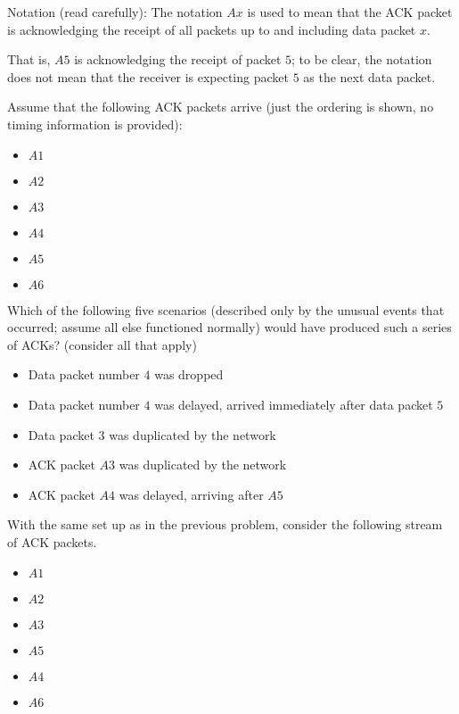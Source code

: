 \documentclass{supervision}
\begin{document}
\begin{questions}
\begin{parts}
\begin{subparts}
                Notation (read carefully): The notation $Ax$ is used to mean
                that the ACK packet is acknowledging the receipt of all packets
                up to and including data packet $x$.

                That is, $A5$ is acknowledging the receipt of packet $5$; to be
                clear, the notation does not mean that the receiver is
                expecting packet $5$ as the next data packet.

                Assume that the following ACK packets arrive (just the ordering
                is shown, no timing information is provided):

                \begin{itemize}
                  \item $A1$
                  \item $A2$
                  \item $A3$
                  \item $A4$
                  \item $A5$
                  \item $A6$
                \end{itemize}

                Which of the following five scenarios (described only by the
                unusual events that occurred; assume all else functioned
                normally) would have produced such a series of ACKs? (consider
                all that apply)

                \begin{itemize}
                  \item Data packet number $4$ was dropped
                  \item Data packet number $4$ was delayed, arrived immediately
                    after data packet $5$
                  \item Data packet $3$ was duplicated by the network
                  \item ACK packet $A3$ was duplicated by the network
                  \item ACK packet $A4$ was delayed, arriving after $A5$
                \end{itemize}

              \subpart With the same set up as in the previous problem,
                consider the following stream of ACK packets.

                \begin{itemize}
                  \item $A1$
                  \item $A2$
                  \item $A3$
                  \item $A5$
                  \item $A4$
                  \item $A6$
                \end{itemize}


\end{subparts}
\end{parts}
\end{questions}
\end{document}
